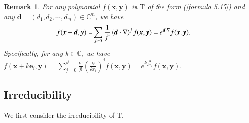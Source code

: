 \documentclass[12pt,reqno]{amsart}
\def\C{\mathbb{C}}
\numberwithin{equation}{section}
\newtheorem{rema}[theo]{Remark}
\begin{document}
\begin{rema}\label{rema 7.1}
    For any polynomial $f(\boldsymbol{x},\boldsymbol{y})$ in $\mathrm{T}$ of the form (\ref{formula 5.17}) and any $\boldsymbol{d}=(d_1,d_2,\cdots,d_m)\in\C^m$,  we have 
\begin{equation*}\label{formula 7.0.1}
\aligned
f(\boldsymbol{x}+\boldsymbol{d},\boldsymbol{y})=&\sum_{j\ge0}\frac{1}{j!}\left(\boldsymbol{d}\cdot \nabla\right)^jf(\boldsymbol{x},\boldsymbol{y})=e^{\boldsymbol{d}\cdot \nabla}f(\boldsymbol{x},\boldsymbol{y}).
\endaligned 
\end{equation*}
    Specifically, for any $k\in \C$, we have $f(\boldsymbol{x}+k\boldsymbol{e}_i,\boldsymbol{y})=\sum_{j=0}^{s^i}\frac{k^j}{j!}\left(\frac{\partial}{\partial{x_i}}\right)^jf(\boldsymbol{x},\boldsymbol{y})
=e^{k\frac{\partial}{\partial{x_i}}}f(\boldsymbol{x},\boldsymbol{y}).$
    
\end{rema}





 
\subsection{Irreducibility}
We first consider the irreducibility of $\mathrm{T}$.
 
\end{document}
